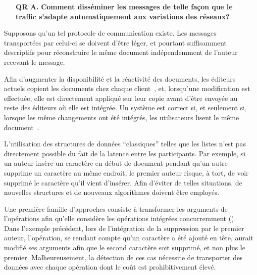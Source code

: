 \begin{itemize}
  \begin{itemize}
  \item [\textbf{QR A.}] \textbf{Comment disséminer les messages de telle façon
      que le traffic s'adapte automatiquement aux variations des réseaux?}
  \end{itemize}

  Supposons qu'un tel protocole de communication existe. Les messages
  transportées par celui-ci se doivent d'être léger, et pourtant suffisamment
  descriptifs pour réconstruire le même document indépendemment de l'auteur
  recevant le message.

  Afin d'augmenter la disponibilité et la réactivité des documents, les éditeurs
  actuels copient les documents chez chaque client~\cite{saito2005optimistic},
  et, lorsqu'une modification est effectuée, elle est directement appliqué sur
  leur copie avant d'être envoyée au reste des éditeurs où elle est intégrée. Un
  système est correct si, et seulement si, lorsque les même changements ont été
  intégrés, les utilisateurs lisent le même document~\cite{shapiro2011conflict}.

  L'utilisation des structures de données ``classiques'' telles que les listes
  n'est pas directement possible du fait de la latence entre les
  participants. Par exemple, si un auteur insère un caractère en début de
  document pendant qu'un autre supprime un caractère au même endroit, le premier
  auteur risque, à tort, de voir supprimé le caractère qu'il vient
  d'insérer. Afin d'éviter de telles situations, de nouvelles structures et de
  nouveaux algorithmes doivent être employés.

  Une première famille d'approches consiste à transformer les arguments de l'opérations
  afin qu'elle considère les opérations intégrées concurremment (\REF). Dans
  l'exemple précédent, lors de l'intégration de la suppression par le premier
  auteur, l'opération, se rendant compte qu'un caractère a été ajouté en tête,
  aurait modifié ses arguments afin que le second caractère soit supprimé, et
  non plus le premier. Malheureusement, la détection de ces cas nécessite de
  transporter des données avec chaque opération dont le coût est prohibitivement
  élevé. 


\end{itemize}
